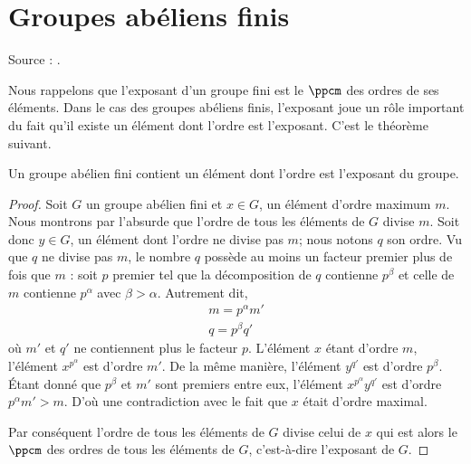 \section{Groupes abéliens finis}

Source : \cite{FabricegPSFinis}.

Nous rappelons que l'exposant d'un groupe fini est le \( \ppcm\) des ordres de ses éléments. Dans le cas des groupes abéliens finis, l'exposant joue un rôle important du fait qu'il existe un élément dont l'ordre est l'exposant. C'est le théorème suivant.

\begin{theorem}
	Un groupe abélien fini contient un élément dont l'ordre est l'exposant du groupe.
\end{theorem}

\begin{proof}
	Soit \( G\) un groupe abélien fini et \( x\in G\), un élément d'ordre maximum \( m\). Nous montrons par l'absurde que l'ordre de tous les éléments de \( G\) divise \( m\). Soit donc \( y\in G\), un élément dont l'ordre ne divise pas \( m\); nous notons \( q\) son ordre. Vu que \( q\) ne divise pas \( m\), le nombre \( q\) possède au moins un facteur premier plus de fois que \( m\) : soit \( p\) premier tel que la décomposition de \( q\) contienne \( p^{\beta}\) et celle de \( m\) contienne \( p^{\alpha}\) avec \( \beta>\alpha\). Autrement dit,
	\begin{subequations}
		\begin{align}
			m=p^{\alpha}m' \\
			q=p^{\beta}q'
		\end{align}
	\end{subequations}
	où \( m'\) et \( q'\) ne contiennent plus le facteur \( p\). L'élément \( x\) étant d'ordre \( m\), l'élément \( x^{p^{\alpha}}\) est d'ordre \( m'\). De la même manière, l'élément \( y^{q'}\) est d'ordre \( p^{\beta}\). Étant donné que \( p^{\beta}\) et \( m'\) sont premiers entre eux, l'élément  \( x^{p^{\alpha}}y^{q'}\) est d'ordre \( p^{\alpha}m'>m\). D'où une contradiction avec le fait que \( x\) était d'ordre maximal.

	Par conséquent l'ordre de tous les éléments de \( G\) divise celui de \( x\) qui est alors le \( \ppcm\) des ordres de tous les éléments de \( G\), c'est-à-dire l'exposant de \( G\).
\end{proof}

